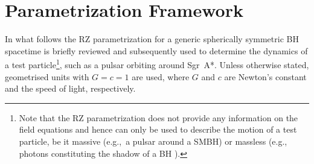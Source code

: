 \documentclass[a4paper,aps,twocolumn,showpacs,showkeys,nofootinbib,preprintnumbers,superscriptaddress,amsmath,amssymb,amsfonts]{revtex4-1}
\newcommand{\eg}{{e.g.,}~}
\begin{document}
\section{Parametrization Framework}
\label{due}
In what follows the RZ parametrization
\cite{Rezzolla2014} for a generic spherically symmetric BH spacetime is briefly reviewed
and subsequently used to determine the dynamics of a test
particle\footnote{Note that the RZ parametrization
  \cite{Rezzolla2014} does not provide any information on the field
  equations and hence can only be used to describe the motion of a test
  particle, be it massive (\eg a pulsar around a SMBH) or massless (\eg
  photons constituting the shadow of a BH \cite{Younsi2016}).}, such as a
pulsar orbiting around Sgr~A*. 
Unless otherwise stated, geometrised units with $G=c=1$ are used, where
$G$ and $c$ are Newton's constant and the speed of light, respectively.
\end{document}
